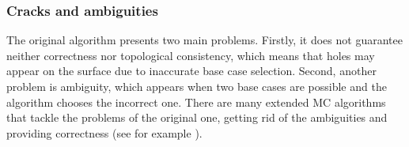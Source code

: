 \subsubsection{Cracks and ambiguities}
The original algorithm presents two main problems. Firstly, it does not guarantee neither correctness nor topological consistency, which means that holes may appear on the surface due to inaccurate base case selection. Second, another problem is ambiguity, which appears when two base cases are possible and the algorithm chooses the incorrect one. There are many extended \ac{MC} algorithms that tackle the problems of the original one, getting rid of the ambiguities and providing correctness (see for example \cite{ExtendedMC}).
